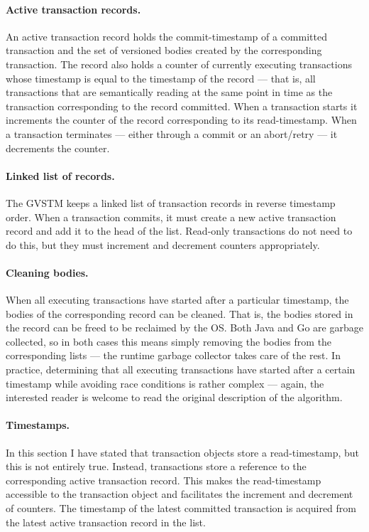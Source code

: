 \documentclass[12pt,a4paper,oneside,openright]{report}
\begin{document}
\paragraph{Active transaction records.} An active transaction record
holds the commit-timestamp of a committed transaction and the set of
versioned bodies created by the corresponding transaction. The record
also holds a counter of currently executing transactions whose
timestamp is equal to the timestamp of the record --- that is, all
transactions that are semantically reading at the same point in time
as the transaction corresponding to the record committed. When a
transaction starts it increments the counter of the record
corresponding to its read-timestamp. When a transaction terminates ---
either through a commit or an abort/retry --- it decrements the
counter.

\paragraph{Linked list of records.} The GVSTM keeps a linked list of
transaction records in reverse timestamp order. When a transaction
commits, it must create a new active transaction record and add it to
the head of the list. Read-only transactions do not need to do this,
but they must increment and decrement counters appropriately.

\paragraph{Cleaning bodies.} When all executing transactions have
started after a particular timestamp, the bodies of the corresponding
record can be cleaned. That is, the bodies stored in the record can be
freed to be reclaimed by the OS. Both Java and Go are garbage
collected, so in both cases this means simply removing the bodies from
the corresponding lists --- the runtime garbage collector takes care
of the rest. In practice, determining that all executing transactions
have started after a certain timestamp while avoiding race conditions
is rather complex --- again, the interested reader is welcome to read
the original description of the algorithm.

\paragraph{Timestamps.} In this section I have stated that transaction
objects store a read-timestamp, but this is not entirely
true. Instead, transactions store a reference to the corresponding
active transaction record. This makes the read-timestamp accessible to
the transaction object and facilitates the increment and decrement of
counters. The timestamp of the latest committed transaction is
acquired from the latest active transaction record in the list.
\end{document}
